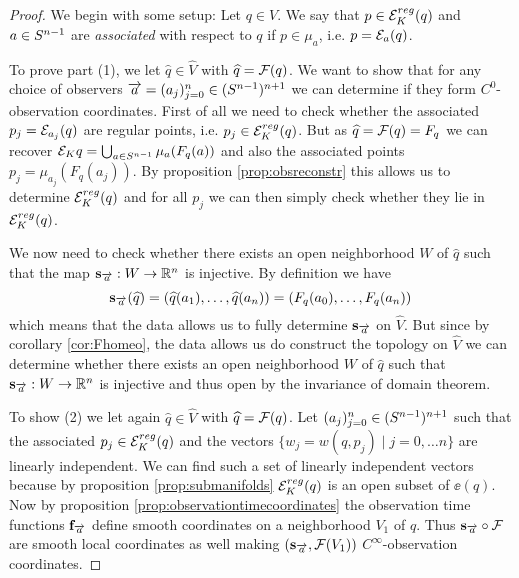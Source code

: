 \begin{proof}
    We begin with some setup: Let $q\in V$. We say that $p\in \er(q)$ and $a\in \sn$ are \emph{associated} with respect to $q$ if $p\in \mu_a$, i.e. $p=\mc{E}_a(q)$. 
    
    To prove part (1), we let $\widehat{q}\in \widehat{V}$ with $\widehat{q}=\F(q)$. We want to show that for any choice of observers $\aa=(a_j)^n_{j=0}\in (\sn)^{n+1}$ we can determine if they form $C^0$-observation coordinates. First of all we need to check whether the associated $p_j=\mc{E}_{a_j}(q)$ are regular points, i.e. $p_j\in \er(q)$. But as $\widehat{q}=\F(q) = F_q$ we can recover $\ee{q}=\bigcup_{a\in \sn}\mu_a(F_q(a))$ and also the associated points $p_j = \mu_{a_j}(F_q(a_j))$. By proposition \ref{prop:obsreconstr} this allows us to determine $\er(q)$ and for all $p_j$ we can then simply check whether they lie in $\er(q)$.
    
    We now need to check whether there exists an open neighborhood $W$ of $\widehat{q}$ such that the map $\mathbf{s}_\aa:W\to\R^n$ is injective. 
    By definition we have 
    \[
    \mathbf{s}_\aa(\widehat{q}) = (\widehat{q}(a_1),\dots,\widehat{q}(a_n)) = (F_q(a_0), \dots ,F_q(a_n))
    \] which means that the data allows us to fully determine $\mathbf{s}_\aa$ on $\widehat{V}$. But since by corollary \ref{cor:Fhomeo}, the data allows us do construct the topology on $\widehat{V}$ we can determine whether there exists an open neighborhood $W$ of $\widehat{q}$ such that $\mathbf{s}_\aa:W\to \R^n$ is injective and thus open by the invariance of domain theorem.
    

    To show (2) we let again $\widehat{q}\in \widehat{V}$ with $\widehat{q}=\F(q)$. 
    Let $(a_j)_{j=0}^n \in (\sn)^{n+1}$ such that the associated $p_j \in \er(q)$ and the vectors $\{w_j = w(q,p_j)\mid j=0,\dots n\}$ are linearly independent. We can find such a set of linearly independent vectors because by proposition \ref{prop:submanifolds} $\er(q)$ is an open subset of $\ee(q)$. Now by proposition \ref{prop:observationtimecoordinates} the observation time functions $\mathbf{f}_\aa$ define smooth coordinates on a neighborhood $V_1$ of $q$. Thus $\mathbf{s}_\aa\circ\F$ are smooth local coordinates as well making $(\mathbf{s}_\aa,\F(V_1))$ $C^\infty$-observation coordinates.


\end{proof}
